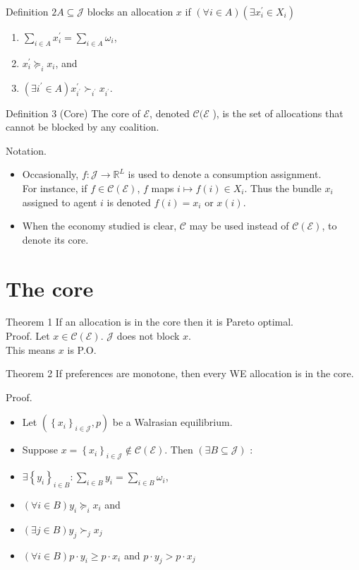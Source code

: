 \documentclass[10pt]{article}
\begin{document}
Definition $2 A \subseteq \mathcal{J}$ blocks an allocation $x$ if $(\forall i \in A)\left(\exists x_{i}^{\prime} \in X_{i}\right)$

\begin{enumerate}
  \item $\sum_{i \in A} x_{i}^{\prime}=\sum_{i \in A} \omega_{i}$,
  \item $x_{i}^{\prime} \succeq_{i} x_{i}$, and
  \item $\left(\exists i^{\prime} \in A\right) x_{i^{\prime}}^{\prime} \succ_{i^{\prime}} x_{i^{\prime}}$.
\end{enumerate}

Definition 3 (Core) The core of $\mathcal{E}$, denoted $\mathcal{C}(\mathcal{E}$ ), is the set of allocations that cannot be blocked by any coalition.

Notation.

\begin{itemize}
  \item Occasionally, $f: \mathcal{J} \rightarrow \mathbb{R}^{L}$ is used to denote a consumption assignment.\\
For instance, if $f \in \mathcal{C}(\mathcal{E})$, $f$ maps $i \mapsto f(i) \in X_{i}$. Thus the bundle $x_{i}$ assigned to agent $i$ is denoted $f(i)=x_{i}$ or $x(i)$.
  \item When the economy studied is clear, $\mathcal{C}$ may be used instead of $\mathcal{C}(\mathcal{E})$, to denote its core.
\end{itemize}

\section*{The core}
Theorem 1 If an allocation is in the core then it is Pareto optimal.\\
Proof. Let $x \in \mathcal{C}(\mathcal{E})$. $\mathcal{J}$ does not block $x$.\\
This means $x$ is P.O.

Theorem 2 If preferences are monotone, then every WE allocation is in the core.

Proof.

\begin{itemize}
  \item Let $\left(\left\{x_{i}\right\}_{i \in \mathcal{J}}, p\right)$ be a Walrasian equilibrium.
  \item Suppose $x=\left\{x_{i}\right\}_{i \in \mathcal{J}} \notin \mathcal{C}(\mathcal{E})$. Then $(\exists B \subseteq \mathcal{J})$ :
  \item $\exists\left\{y_{i}\right\}_{i \in B}: \sum_{i \in B} y_{i}=\sum_{i \in B} \omega_{i}$,
  \item $(\forall i \in B) y_{i} \succeq_{i} x_{i}$ and
  \item $(\exists j \in B) y_{j} \succ_{j} x_{j}$
  \item $(\forall i \in B) p \cdot y_{i} \geq p \cdot x_{i}$ and $p \cdot y_{j}>p \cdot x_{j}$
\end{itemize}
\end{document}

